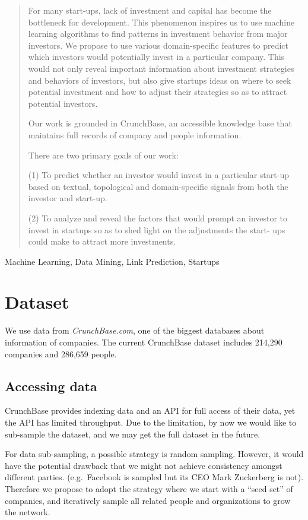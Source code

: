 \begin{abstract}

For many start-ups, lack of investment and capital has become the
bottleneck for development. This phenomenon inspires us to use machine
learning algorithms to find patterns in investment behavior from major
investors. We propose to use various domain-specific features to predict
which investors would potentially invest in a particular company.
This would not only reveal important information about investment
strategies and behaviors of investors, but also give startups ideas on
where to seek potential investment and how to adjust their strategies
so as to attract potential investors.

Our work is grounded in CrunchBase, an accessible knowledge base that
maintains full records of company and people information.

There are two primary goals of our work:

(1) To predict whether an investor would invest in a particular start-up
based on textual, topological and domain-specific signals from both
the investor and start-up.

(2) To analyze and reveal the factors that would prompt an investor to
invest in startups so as to shed light on the adjustments the start-
ups could make to attract more investments.

\end{abstract}

\keywords
{Machine Learning, Data Mining, Link Prediction, Startups}

\section{Dataset}\label{dataset}

We use data from \emph{CrunchBase.com}, one of the biggest databases
about information of companies. The current CrunchBase dataset includes
214,290 companies and 286,659 people.

\subsection{Accessing data}\label{accessing-data}

CrunchBase provides indexing data and an API for full access of their
data, yet the API has limited throughput. Due to the limitation, by now
we would like to sub-sample the dataset, and we may get the full dataset
in the future.

For data sub-sampling, a possible strategy is random sampling. However,
it would have the potential drawback that we might not achieve
consistency amongst different parties. (e.g.~Facebook is sampled but its
CEO Mark Zuckerberg is not). Therefore we propose to adopt the strategy
where we start with a ``seed set'' of companies, and iteratively sample
all related people and organizations to grow the network.

